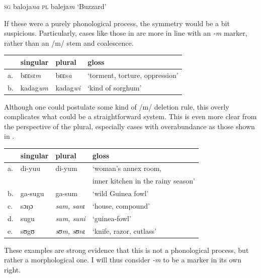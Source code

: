 \begin{exe}
    \ex \textsc{sg} baloja\textit{na} \textsc{pl} baleja\textit{m} `Buzzard'
\end{exe}

If these were a purely phonological process, the symmetry would be a bit suspicious. Particularly, cases like those in  are more in line with an \textit{-m} marker, rather than an /m/ stem and coalescence.

\begin{exe}
    \ex \label{except-m}
    \begin{tabular}[t]{llll}
      & singular & plural  & gloss                          \\
      \midrule
      a. & bɛɛs\textit{ɩm}   & bɛɛs\textit{a}   & `torment, torture, oppression' \\
      b. & kadag\textit{um}  & kadag\textit{wi} & `kind of sorghum'              \\
    \end{tabular}
\end{exe}

Although one could postulate some kind of /m/ deletion rule, this overly complicates what could be a straightforward system. This is even more clear from the perspective of the plural, especially cases with overabundance as those shown in .

\begin{exe}
    \ex \label{over-m}
    \begin{tabular}[t]{llll}
         & singular & plural             & gloss                              \\
      \midrule
      a. & di-yuu   & di-yum             & `woman's annex room,               \\
         &          &                    & inner kitchen in the rainy season' \\
      b. & ga-sugu  & ga-sum             & `wild Guinea fowl'                 \\
      c. & sɔŋɔ     & \textit{sam, sanɩ} & `house, compound'                  \\
      d. & sugu     & \textit{sum, suni} & `guinea-fowl'                      \\
      e. & sʊgʊ     & \textit{sʊm, sʊnɩ} & `knife, razor, cutlass'            \\
    \end{tabular}
\end{exe}

These examples are strong evidence that this is not a phonological process, but rather a morphological one. I will thus consider \textit{-m} to be a marker in its own right.


